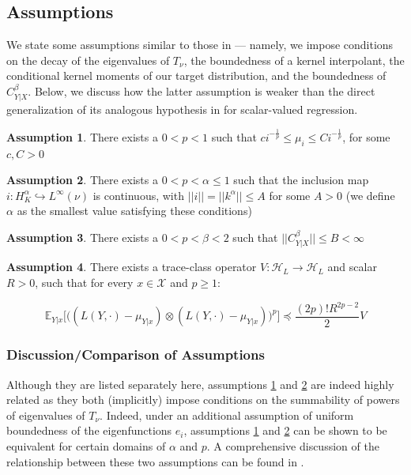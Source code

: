\documentclass[accepted]{article}
\theoremstyle{definition}
\newtheorem{assumption}{Assumption}
\begin{document}
\subsection{Assumptions}
\label{Assumptions Section}
We state some assumptions similar to those in \cite{fischer2020sobolev} --- namely, we impose conditions on the decay of the eigenvalues of $T_{\nu}$, the boundedness of a kernel interpolant, the conditional kernel moments of our target distribution, and the boundedness of $C^{\beta}_{Y|X}$. Below, we discuss how the latter assumption is weaker than the direct generalization of its analogous hypothesis in \cite{fischer2020sobolev} for scalar-valued regression.
\begin{assumption}
\label{EVD}
There exists a $0 < p < 1$ such that $ci^{-\frac{1}{p}} \leq \mu_i \leq Ci^{-\frac{1}{p}}$, for some $c, C > 0$
\end{assumption}
\begin{assumption}
\label{EMB}
There exists a $0 < p < \alpha \leq 1$ such that the inclusion map $i: H_K^{\alpha} \hookrightarrow L^{\infty}(\nu)$ is continuous, with $||i|| = ||k^{\alpha}|| \leq A$ for some $A > 0$ (we define $\alpha$ as the smallest value satisfying these conditions)
\end{assumption}
\begin{assumption}
\label{Hypothesis Space}
There exists a $0 < p < \beta < 2$ such that $||C^{\beta}_{Y|X}|| \leq B < \infty$
\end{assumption}
\begin{assumption}
\label{Subexponential}
There exists a trace-class operator $V: \mathcal{H}_L \to \mathcal{H}_L$ and scalar $R > 0$, such that for every $x \in \mathcal{X}$ and $p \geq 1$:
\begin{small}
\begin{equation}
\label{Moment Condition}
    \mathbb{E}_{Y|x}\Big[\Big((L(Y, \cdot) - \mu_{Y|x}) \otimes (L(Y, \cdot) - \mu_{Y|x})\Big)^p\Big] 
    \preccurlyeq \frac{(2p)!R^{2p - 2}}{2}V
\end{equation}
\end{small}
\end{assumption}

\subsubsection{Discussion/Comparison of Assumptions} 
\label{Assumption Discussion Section}
Although they are listed separately here, assumptions \ref{EVD} and \ref{EMB} are indeed highly related as they both (implicitly) impose conditions on the summability of powers of eigenvalues of $T_{\nu}$. Indeed, under an additional assumption of uniform boundedness of the eigenfunctions $e_i$, assumptions \ref{EVD} and \ref{EMB} can be shown to be equivalent for certain domains of $\alpha$ and $p$. A comprehensive discussion of the relationship between these two assumptions can be found in \cite{fischer2020sobolev, steinwart2012mercer}. 
\end{document}
